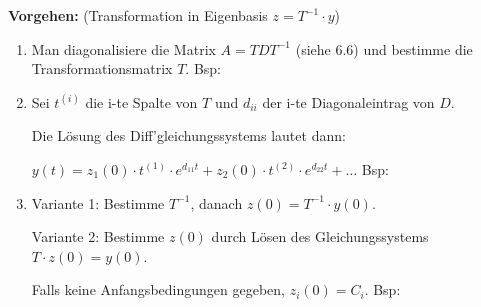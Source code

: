 {\vskip6pt

\textbf{Vorgehen:} (Transformation in Eigenbasis $z = T^{-1}\cdot y$) \vskip1pt

\begin{enumerate}[label=\protect\circled{\arabic*}]
\item Man diagonalisiere die Matrix $A = TDT^{-1}$ (siehe 6.6) und bestimme die Transformationsmatrix $T$.
\vskip2pt Bsp: \scalebox{0.8}{\hskip8pt$D = \begin{pmatrix}2 & 0 \\ 0 & 5 \end{pmatrix}, \hskip3pt T = \begin{pmatrix}-2 & 1 \\ 1 & 1 \end{pmatrix}$} \par

\item Sei $t^{(i)}$ die i-te Spalte von $T$ und $d_{ii}$ der i-te Diagonaleintrag von $D$. \par Die Lösung des Diff'gleichungssystems lautet dann:\par $y(t) = z_1(0)\cdot t^{(1)}\cdot e^{d_{11} t} + z_2(0)\cdot t^{(2)}\cdot e^{d_{22} t} + \hdots$
\vskip2pt Bsp:  \par

\item Variante 1: Bestimme $T^{-1}$, danach $z(0) = T^{-1}\cdot y(0)$. \par
Variante 2: Bestimme $z(0)$ durch Lösen des Gleichungssystems $T\cdot z(0) = y(0)$. \par
Falls keine Anfangsbedingungen gegeben, $z_i(0) = C_i$.
\vskip2pt Bsp: \scalebox{0.8}{\hskip8pt$\begin{pmatrix}-1/3 & 1/3 \\ 1/3 & 2/3 \end{pmatrix} \cdot \begin{pmatrix} 3 \\ 6 \end{pmatrix} = \begin{pmatrix} 1 \\ 5 \end{pmatrix} = \begin{pmatrix} z_1(0) \\ z_2(0) \end{pmatrix}$} \par

\end{enumerate}
\vspace{-2pt}

}
\WhiteSpace